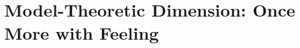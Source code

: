 %
%
%
\chapter{Model-Theoretic Dimension: Once More with Feeling}
\label{chap:alg_dimensionality} %


